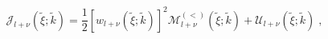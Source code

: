 \begin{equation}
{\mathcal J_{l+\nu}} ( \tilde{\xi};  \tilde{k}  )
=
\frac{1}{2}  \left[ w_{l+\nu} (\tilde{\xi};  \tilde{k} ) \right]^{2} 
{\mathcal M}^{(<)}_{l+\nu} ( \tilde{\xi};  \tilde{k}  ) 
+
{\mathcal U}_{l+\nu} ( \tilde{\xi};  \tilde{k}  ) 
\; ,
\label{eq:mathcal_J_integral_useful}
\end{equation}

